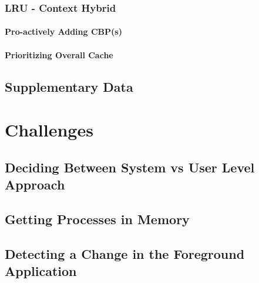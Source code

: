 \documentclass[12pt]{uthesis-v12}  %
\begin{document}
			\subsubsection{LRU - Context Hybrid}
				\paragraph{Pro-actively Adding CBP(s)}
					
				\paragraph{Prioritizing Overall Cache}	
		\subsection{Supplementary Data}
			
	\section{Challenges}
		
		\subsection{Deciding Between System vs User Level Approach}
		
		\subsection{Getting Processes in Memory}
		
		\subsection{Detecting a Change in the Foreground Application}
		
\end{document}
